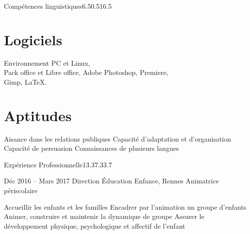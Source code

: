 \documentclass[30pt, french]{tccv}
\begin{document}
\begin{upshape}
\begin{rounded_frame}{Compétences linguistiques}{6.5}{0.5}{16.5}{}
\vspace{0.5cm}
\section{Logiciels}
Environnement PC et Linux, \\
Pack office et Libre office,
Adobe Photoshop, Premiere, \\
Gimp,
\LaTeX.

\vspace{0.5cm}
\section{Aptitudes}
\begin{itemize}[leftmargin=13pt]
  \setlength\itemsep{-3pt} 
  \cvitem[\checkmark]  Aisance dans les relations publiques
  \cvitem[\checkmark]  Capacité d'adaptation et d'organisation
  \cvitem[\checkmark]  Capacité de persuasion
  \cvitem[\checkmark]  Connaissances de plusieurs langues
\end{itemize}

\vspace{0.3cm}

\end{rounded_frame}




%
%


\begin{flat_frame}{Expérience Professionnelle}{13.3}{7.3}{3.7}{}
\begin{eventlist}


    
    
    
\item{Déc 2016 -- Mars 2017}
     {Direction Éducation Enfance, Rennes}
     {Animatrice périscolaire}
     \fontsize{9pt}{1em}\color{text}\bodyfontlight\upshape\selectfont
    
    \begin{itemize}
      \cvitem[\checkmark] Accueillir les enfants et les familles                      
      \cvitem[\checkmark] Encadrer par l’animation un groupe d’enfants
      \cvitem[\checkmark] Animer, construire et maintenir la dynamique de groupe               
      \cvitem[\checkmark] Assurer le développement physique, psychologique et affectif de l’enfant                                            
    \end{itemize}     





\end{eventlist}
\end{flat_frame}
\end{upshape}
\end{document}
